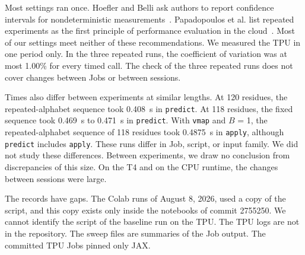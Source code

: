 Most settings ran once. Hoefler and Belli ask authors to report confidence intervals for nondeterministic
measurements~\cite{hoefler2015benchmarking}. Papadopoulos et al. list repeated experiments as the first principle of performance evaluation in the cloud~\cite{papadopoulos2021principles}.
 Most of our settings meet neither of these
recommendations. We measured the TPU in one period only.
In the three repeated runs, the coefficient of variation was at most 1.00\% for every timed call. %
The check of the three repeated runs does not cover changes between Jobs or between sessions.

Times also differ between experiments at similar lengths.
At 120 residues, the repeated-alphabet sequence took 0.408~s in \texttt{predict}. %
At 118 residues, the fixed sequence took 0.469~s to 0.471~s in \texttt{predict}. %
With \texttt{vmap} and $B$ = 1, the repeated-alphabet sequence of 118 residues took 0.4875~s in \texttt{apply}, although \texttt{predict} includes \texttt{apply}. %
These runs differ in Job, script, or input family. We did not study these differences. Between experiments, we draw no
conclusion from discrepancies of this size. On the T4 and on the CPU runtime, the changes between sessions were large.

The records have gaps.
The Colab runs of August 8, 2026, used a copy of the script, and this copy exists only inside the notebooks of commit 2755250. %
We cannot identify the script of the baseline run on the TPU. The TPU logs are not in the repository. The sweep files are
summaries of the Job output. The committed TPU Jobs pinned only JAX.
